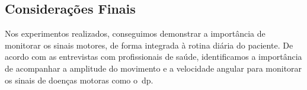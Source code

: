 


\subsection{Considerações Finais}\label{sec:cons_finais}



Nos experimentos realizados, conseguimos demonstrar a importância de monitorar os sinais motores, de forma integrada à rotina diária do paciente. De acordo com as entrevistas com profissionais de saúde, identificamos a importância de acompanhar a amplitude do movimento e a velocidade angular para monitorar os sinais de doenças motoras como o~\ac{dp}.

